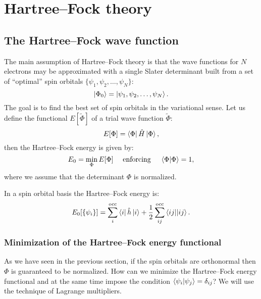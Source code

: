 \documentclass[../Main/chem532-notes.tex]{subfiles}
\begin{document}
\chapter{Hartree--Fock theory}

\section{The Hartree--Fock wave function}
The main assumption of Hartree--Fock theory is that the wave functions for $N$ electrons may be approximated with a single Slater determinant built from a set of ``optimal'' spin orbitals $\{ \psi_1, \psi_2, \ldots, \psi_N \}$:
\begin{equation}
\ket{\Phi_0} = \ket{\psi_1, \psi_2, \ldots, \psi_N }.
\end{equation}
The goal is to find the best set of spin orbitals in the variational sense. 
Let us define the functional $E[\tilde{\Phi}]$ of a trial wave function $\tilde{\Phi}$:
\begin{equation}
E[\Phi] = \bra{\Phi} \hat{H} \ket{\Phi},
\end{equation}
then the Hartree--Fock energy is given by:
\begin{equation}
E_0 = \min_{\Phi} E[\Phi] \quad \text{ enforcing }  \quad\braket{\Phi | \Phi} = 1,
\end{equation}
where we assume that the determinant $\Phi$ is normalized.

In a spin orbital basis the Hartree--Fock energy is:
\begin{equation}
E_0[\{ \psi_i \}] = \sum_i^{\rm occ} \bra{i} \hat{h} \ket{i} + \frac{1}{2} \sum_{ij}^{\rm occ} \bra{ij}\!\ket{ij}.
\end{equation}


\subsection{Minimization of the Hartree--Fock energy functional}
As we have seen in the previous section, if the spin orbitals are orthonormal then $\Phi$ is guaranteed to be normalized.
How can we minimize the Hartree--Fock energy functional and at the same time impose the condition $\braket{\psi_i|\psi_j} = \delta_{ij}$?
We will use the technique of Lagrange multipliers.
\end{document}
